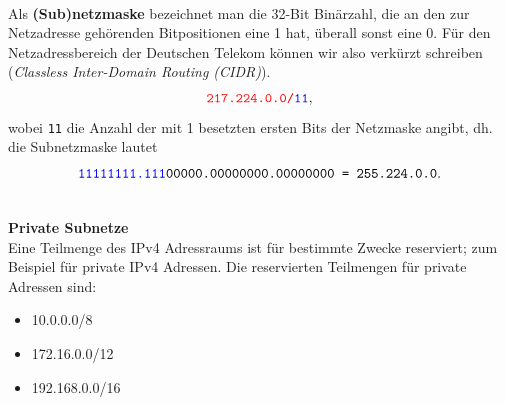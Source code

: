 ~\\
Als \textbf{(Sub)netzmaske} bezeichnet man die 32-Bit Binärzahl, die an den zur Netzadresse gehörenden Bitpositionen eine 1 hat, überall sonst eine 0. 
Für den Netzadressbereich der Deutschen Telekom können wir also verkürzt schreiben (\textit{Classless Inter-Domain Routing (CIDR)}).
$$\texttt{\color{red}217.224.0.0/\color{blue}11},$$
wobei \texttt{\color{blue}11} die Anzahl der mit 1 besetzten ersten Bits der Netzmaske angibt, dh. die Subnetzmaske lautet
$$\texttt{{\color{blue}11111111.111}00000.00000000.00000000 = 255.224.0.0}.$$
 
%
%
%
%
~\\
\textbf{Private Subnetze}\\
Eine Teilmenge des IPv4 Adressraums ist für bestimmte Zwecke reserviert; zum Beispiel für private IPv4 Adressen. Die reservierten Teilmengen für private Adressen sind:
\begin{itemize}
	\item 10.0.0.0/8
	\item 172.16.0.0/12
     \item 192.168.0.0/16
\end{itemize}
